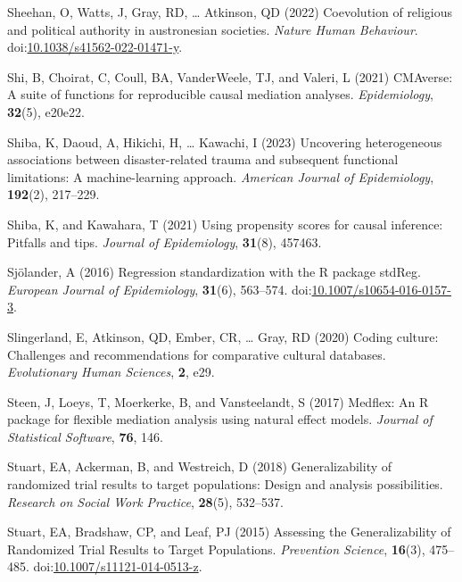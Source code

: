 \documentclass[
  singlecolumn]{article}
\newlength{\cslhangindent}
\newenvironment{CSLReferences}[2] %
 {\begin{list}{}{%
  \setlength{\itemindent}{0pt}
  \setlength{\leftmargin}{0pt}
  \setlength{\parsep}{0pt}
  \ifodd #1
   \setlength{\leftmargin}{\cslhangindent}
   \setlength{\itemindent}{-1\cslhangindent}
  \fi
  \setlength{\itemsep}{#2\baselineskip}}}
 {\end{list}}
\begin{document}
\begin{CSLReferences}{1}{0}
Sheehan, O, Watts, J, Gray, RD, \ldots{} Atkinson, QD (2022) Coevolution
of religious and political authority in austronesian societies.
\emph{Nature Human Behaviour}.
doi:\href{https://doi.org/10.1038/s41562-022-01471-y}{10.1038/s41562-022-01471-y}.

Shi, B, Choirat, C, Coull, BA, VanderWeele, TJ, and Valeri, L (2021)
CMAverse: A suite of functions for reproducible causal mediation
analyses. \emph{Epidemiology}, \textbf{32}(5), e20e22.

Shiba, K, Daoud, A, Hikichi, H, \ldots{} Kawachi, I (2023) Uncovering
heterogeneous associations between disaster-related trauma and
subsequent functional limitations: A machine-learning approach.
\emph{American Journal of Epidemiology}, \textbf{192}(2), 217--229.

Shiba, K, and Kawahara, T (2021) Using propensity scores for causal
inference: Pitfalls and tips. \emph{Journal of Epidemiology},
\textbf{31}(8), 457463.

Sjölander, A (2016) Regression standardization with the R package
stdReg. \emph{European Journal of Epidemiology}, \textbf{31}(6),
563--574.
doi:\href{https://doi.org/10.1007/s10654-016-0157-3}{10.1007/s10654-016-0157-3}.

Slingerland, E, Atkinson, QD, Ember, CR, \ldots{} Gray, RD (2020) Coding
culture: Challenges and recommendations for comparative cultural
databases. \emph{Evolutionary Human Sciences}, \textbf{2}, e29.

Steen, J, Loeys, T, Moerkerke, B, and Vansteelandt, S (2017) Medflex: An
{R} package for flexible mediation analysis using natural effect models.
\emph{Journal of Statistical Software}, \textbf{76}, 146.

Stuart, EA, Ackerman, B, and Westreich, D (2018) Generalizability of
randomized trial results to target populations: Design and analysis
possibilities. \emph{Research on Social Work Practice}, \textbf{28}(5),
532--537.

Stuart, EA, Bradshaw, CP, and Leaf, PJ (2015) Assessing the
Generalizability of Randomized Trial Results to Target Populations.
\emph{Prevention Science}, \textbf{16}(3), 475--485.
doi:\href{https://doi.org/10.1007/s11121-014-0513-z}{10.1007/s11121-014-0513-z}.


\end{CSLReferences}
\end{document}
